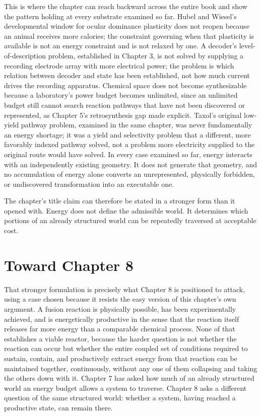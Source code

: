 \documentclass[11pt]{book}
\begin{document}
This is where the chapter can reach backward across the entire book and show the pattern holding at every substrate examined so far. Hubel and Wiesel's developmental window for ocular dominance plasticity does not reopen because an animal receives more calories; the constraint governing when that plasticity is available is not an energy constraint and is not relaxed by one. A decoder's level-of-description problem, established in Chapter 3, is not solved by supplying a recording electrode array with more electrical power; the problem is which relation between decoder and state has been established, not how much current drives the recording apparatus. Chemical space does not become synthesizable because a laboratory's power budget becomes unlimited, since an unlimited budget still cannot search reaction pathways that have not been discovered or represented, as Chapter 5's retrosynthesis gap made explicit. Taxol's original low-yield pathway problem, examined in the same chapter, was never fundamentally an energy shortage; it was a yield and selectivity problem that a different, more favorably indexed pathway solved, not a problem more electricity supplied to the original route would have solved. In every case examined so far, energy interacts with an independently existing geometry. It does not generate that geometry, and no accumulation of energy alone converts an unrepresented, physically forbidden, or undiscovered transformation into an executable one.

The chapter's title claim can therefore be stated in a stronger form than it opened with. Energy does not define the admissible world. It determines which portions of an already structured world can be repeatedly traversed at acceptable cost.

\section{Toward Chapter 8}

That stronger formulation is precisely what Chapter 8 is positioned to attack, using a case chosen because it resists the easy version of this chapter's own argument. A fusion reaction is physically possible, has been experimentally achieved, and is energetically productive in the sense that the reaction itself releases far more energy than a comparable chemical process. None of that establishes a viable reactor, because the harder question is not whether the reaction can occur but whether the entire coupled set of conditions required to sustain, contain, and productively extract energy from that reaction can be maintained together, continuously, without any one of them collapsing and taking the others down with it. Chapter 7 has asked how much of an already structured world an energy budget allows a system to traverse. Chapter 8 asks a different question of the same structured world: whether a system, having reached a productive state, can remain there.
\end{document}
